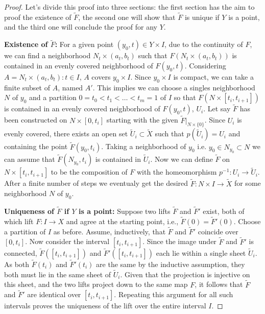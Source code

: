 \documentclass[12pt]{article}
\begin{document}
\begin{proof}
	Let's divide this proof into three sections: the first section has the aim to proof the existence of \(\tilde{F}\), the second one will show that \(\tilde{F}\) is unique if \(Y\) is a point, and the third one will conclude the proof for any \(Y\).

	\textbf{Existence of \(\tilde{F}\):} For a given point \((y_0, t) \in Y \times I\), due to the continuity of \(F\), we can find a neighborhood \(N_t \times (a_t, b_t)\) such that \(F(N_t \times (a_t, b_t))\) is contained in an evenly covered neighborhood of \(F(y_0, t)\). Considering \(A = {N_t \times (a_t, b_t) : t \in I}\), \(A\) covers \({y_0} \times I\). Since \({y_0} \times I\) is compact, we can take a finite subset of \(A\), named \(A'\). This implies we can choose a singles neighborhood \(N\) of \(y_0\) and a partition \(0 = t_0 < t_1 < \dots < t_m = 1\) of \(I\) so that  \(F(N \times [t_i, t_{i+1}])\) is contained in an evenly covered neighborhood of \(F(y_0, t)\), \(U_i\). Let say \(\tilde{F}\) has been constructed on \(N \times [0, t_i]\) starting with the given \(\tilde{F}|_{N \times \{0\}}\). Since \(U_i\) is evenly covered, there exists an open set \(\tilde{U}_i \subset \tilde{X}\) such that \(p(\tilde{U}_i) = U_i\) and containing the point \(\tilde{F}(y_0, t_i)\). Taking a neighborhood of \(y_0\) i.e. \(y_0 \in N_{y_0} \subset N\) we can assume that \(\tilde{F}(N_{y_0}, {t_i})\) is contained in \(\tilde{U}_i\). Now we can define \(\tilde{F}\) on \(N \times [t_i, t_{i+1}]\) to be the composition of \(F\) with the homeomorphism \(p^{-1} : U_i \rightarrow \tilde{U}_i\). After a finite number of steps we eventualy get the desired \(\tilde{F} : N \times I \rightarrow \tilde{X}\) for some neighborhood \(N\) of \(y_0\).
	
	
    \textbf{Uniqueness of \(\tilde{F}\) if \(Y\) is a point:} Suppose two lifts \(\tilde{F}\) and \(\tilde{F}'\) exist, both of which lift \(F : I \rightarrow X\) and agree at the starting point, i.e., \(\tilde{F}(0) = \tilde{F}'(0)\). Choose a partition of \(I\) as before. Assume, inductively, that \(\tilde{F}\) and \(\tilde{F}'\) coincide over \([0, t_i]\). Now consider the interval \([t_i, t_{i+1}]\). Since the image under \(\tilde{F}\) and \(\tilde{F}'\) is connected, \(\tilde{F}([t_i, t_{i+1}])\) and \(\tilde{F}'([t_i, t_{i+1}])\) each lie within a single sheet \(\tilde{U}_i\). As both \(\tilde{F}(t_i)\) and \(\tilde{F}'(t_i)\) are the same by the inductive assumption, they both must lie in the same sheet of \(\tilde{U}_i\). Given that the projection is injective on this sheet, and the two lifts project down to the same map \(F\), it follows that \(\tilde{F}\) and \(\tilde{F}'\) are identical over \([t_i, t_{i+1}]\). Repeating this argument for all such intervals proves the uniqueness of the lift over the entire interval \(I\).
	

\end{proof}
\end{document}
